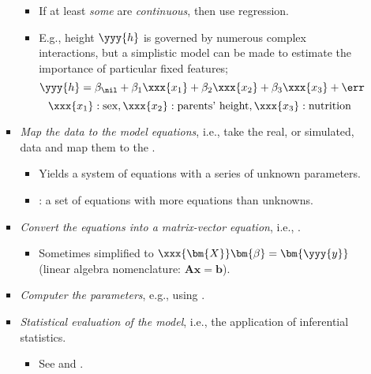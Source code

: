 \begin{itemize}
\begin{itemize}
\begin{itemize}
\begin{itemize}
          \item If at least \emph{some}  are \emph{continuous}, then use regression.
          \item E.g., height \(\yyy{h}\) is governed by numerous complex interactions, but a simplistic model can be made to estimate the importance of particular fixed features;
          \[%
          \yyy{h} = \beta_\nil + \beta_1 \xxx{x_1} + \beta_2 \xxx{x_2} + \beta_3  \xxx{x_3} + \err
          \]%
          \[%
          \xxx{x_1}: \text{sex},\xxx{x_2}: \text{parents' height}, \xxx{x_3}: \text{nutrition}
          \]%
        \end{itemize}
      \item \emph{Map the data to the model equations}, i.e.,  take the real, or simulated, data and map them to the .
        \begin{itemize}
          \item Yields a system of equations with a series of unknown parameters. 
          \item {}: a set of equations with more equations than unknowns.
        \end{itemize}
      \item \emph{Convert the equations into a matrix-vector equation}, i.e., \hyperref[Section: Regression Models]{}.
        \begin{itemize}
          \item Sometimes simplified to \(\xxx{\bm{X}}\bm{\beta} = \bm{\yyy{y}}\) (linear algebra nomenclature: \(\bm{Ax}=\bm{b}\)).
        \end{itemize}
      \item \emph{Computer the parameters}, e.g., using \hyperref[Subsection: Least-Squares]{}.
      \item \emph{Statistical evaluation of the model}, i.e., the application of inferential statistics.
        \begin{itemize}
          \item See \hyperref[Subsection: Model Significance]{} and \hyperref[Subsection: Standardized Regression Coefficients]{}.
        \end{itemize}
    \end{itemize}
  \end{itemize}


\end{itemize}
